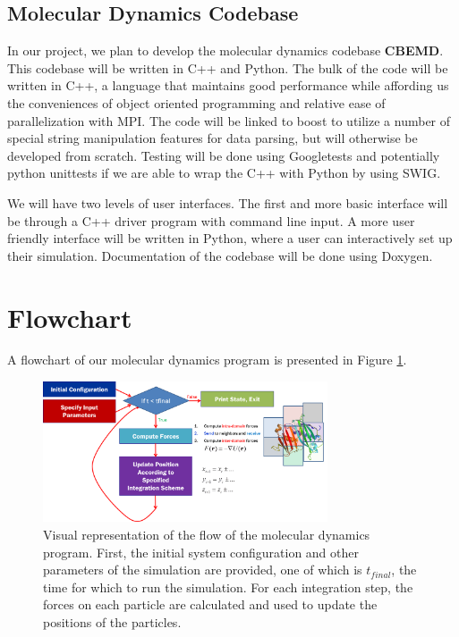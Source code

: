 \documentclass[10pt]{article}
\begin{document}
\subsection{Molecular Dynamics Codebase}
In our project, we plan to develop the molecular dynamics codebase \textbf{CBEMD}. This codebase will be written in C++ and Python. The bulk of the code will be written in C++, a language that maintains good performance while affording us the conveniences of object oriented programming and relative ease of parallelization with MPI. The code will be linked to boost to utilize a number of special string manipulation features for data parsing, but will otherwise be developed from scratch. Testing will be done using Googletests and potentially python unittests if we are able to wrap the C++ with Python by using SWIG.

We will have two levels of user interfaces.  The first and more basic interface will be through a C++ driver program with command line input.  A more user friendly interface will be written in Python, where a user can interactively set up their simulation. Documentation of the codebase will be done using Doxygen.



\section{Flowchart}
A flowchart of our molecular dynamics program is presented in Figure \ref{fig:flowchart}.
\begin{figure}[h]
\centering
\includegraphics[width=0.75\textwidth]{flowchart.png}
\caption{Visual representation of the flow of the molecular dynamics program. First, the initial system configuration and other parameters of the simulation are provided, one of which is $t_{final}$, the time for which to run the simulation. For each integration step, the forces on each particle are calculated and used to update the positions of the particles.}
\label{fig:flowchart}
\end{figure}
\end{document}
